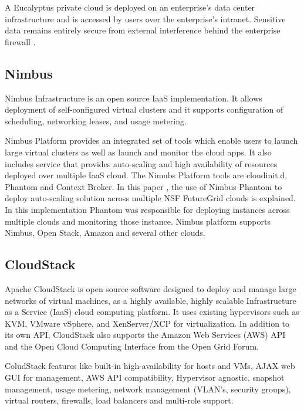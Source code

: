 {     A Eucalyptus private cloud is deployed on an enterprise’s data
     center infrastructure and is accessed by users over the
     enterprise’s intranet. Sensitive data remains entirely secure
     from external interference behind the enterprise firewall
     \cite{www-eucalyptus}.

     
\subsection{Nimbus \cv}

     Nimbus Infrastructure \cite{www-nimbus-wiki} is an open source
     IaaS implementation. It allows deployment of self-configured
     virtual clusters and it supports configuration of scheduling,
     networking leases, and usage metering.

     Nimbus Platform \cite{www-nimbus} provides an integrated set of
     tools which enable users to launch large virtual clusters as well
     as launch and monitor the cloud apps. It also includes service
     that provides auto-scaling and high availability of resources
     deployed over multiple IaaS cloud.  The Nimubs Platform tools are
     cloudinit.d, Phantom and Context Broker.  In this paper
     \cite{nimbus-paper}, the use of Nimbus Phantom
     to deploy auto-scaling solution across multiple NSF FutureGrid
     clouds is explained. In this implementation Phantom was responsible 
     for deploying instances across multiple clouds and monitoring those
     instance.  Nimbus platform supports Nimbus, Open Stack, Amazon
     and several other clouds.

\subsection{CloudStack \cv}

     Apache CloudStack is open source software designed to deploy and
     manage large networks of virtual machines, as a highly available,
     highly scalable Infrastructure as a Service (IaaS) cloud
     computing platform. It uses existing hypervisors such as KVM,
     VMware vSphere, and XenServer/XCP for virtualization. In addition
     to its own API, CloudStack also supports the Amazon Web Services
     (AWS) API and the Open Cloud Computing Interface from the Open
     Grid Forum. \cite{www-cloudstack}

     ColudStack features like built-in high-availability for hosts
     and VMs, AJAX web GUI for management, AWS API compatibility,
     Hypervisor agnostic, snapshot management, usage metering, network
     management (VLAN's, security groups), virtual routers, firewalls,
     load balancers and multi-role support. \cite{www-cloudstack-wikipedia}
	  
}
